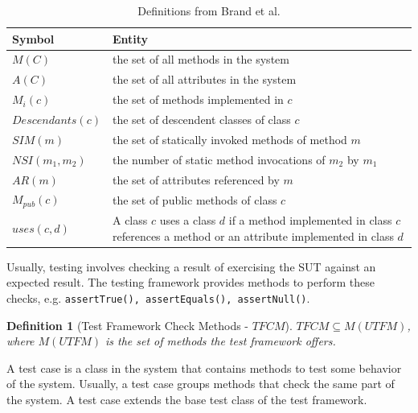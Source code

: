 \documentclass{uvamscse}
\newtheorem{definition}{Definition}[section]
\begin{document}
\begin{table}[]
	\centering
	
	\label{table:complexityTS}
	\begin{tabular}{|l|p{10cm}|}
		\hline 
		\textbf{Symbol}                           & \textbf{Entity}                                                                                                              \\
		\hline 
		$M(C)$                  & the set of all methods in the system \\
		$A(C)$ & the set of all attributes in the system      \\
		
		$M_i(c)$             & the set of methods implemented in $c$                          \\
		$Descendants(c)$       & the set of descendent classes of class $c$  \\
		
		$SIM(m) $ & the set of statically invoked methods of method $m$ \\
		
		$NSI(m_1, m_2)$ & the number of static method invocations of $m_2$ by $m_1$\\
		
		$AR(m)$ & the set of attributes referenced by $m$\\
		
		$M_{pub}(c)$ & the set of public methods of class $c$\\
		
		$uses(c,d)$ & A class $c$ uses a class $d$ if a method implemented in class $c$ references a method or an attribute implemented in class $d$ \\
		\hline
	\end{tabular}
	\caption{Definitions from Brand et al. \cite{briand1999unified}}
\end{table}

Usually, testing involves checking a result of exercising the SUT against an expected result. The testing framework provides methods to perform these checks, e.g. \texttt{assertTrue(), assertEquals(), assertNull()}.

\begin{definition}[Test Framework Check Methods - $TFCM$]
	\label{def:tfcm}
	$TFCM \subseteq M(UTFM)$, where $M(UTFM)$ is the set of methods the test framework offers.
\end{definition}

A test case is a class in the system that contains methods to test some behavior of the system. Usually, a test case groups methods that check the same part of the system. A test case extends the base test class of the test framework. 
\end{document}
